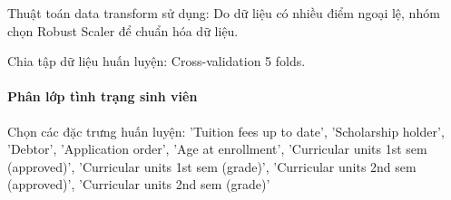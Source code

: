     Thuật toán data transform sử dụng: Do dữ liệu có nhiều điểm ngoại lệ, nhóm chọn Robust Scaler để chuẩn hóa dữ liệu.

    Chia tập dữ liệu huấn luyện: Cross-validation 5 folds.

    \paragraph{Phân lớp tình trạng sinh viên}
    \leavevmode

    Chọn các đặc trưng huấn luyện: 'Tuition fees up to date',
    'Scholarship holder',
    'Debtor', 'Application order', 
    'Age at enrollment', 
    'Curricular units 1st sem (approved)', 
    'Curricular units 1st sem (grade)',
    'Curricular units 2nd sem (approved)', 
    'Curricular units 2nd sem (grade)'


